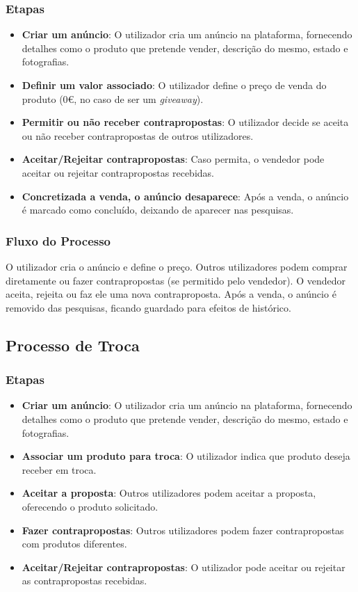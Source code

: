 \documentclass[a4paper, 12pt]{article} %
\begin{document}
\subsubsection{Etapas}
\begin{itemize}
	\item \textbf{Criar um anúncio}: O utilizador cria um anúncio na plataforma, fornecendo detalhes como o produto que pretende vender, descrição do mesmo, estado e fotografias.
	\item \textbf{Definir um valor associado}: O utilizador define o preço de venda do produto (0€, no caso de ser um \textit{giveaway}).
	\item \textbf{Permitir ou não receber contrapropostas}: O utilizador decide se aceita ou não receber contrapropostas de outros utilizadores.
	\item \textbf{Aceitar/Rejeitar contrapropostas}: Caso permita, o vendedor pode aceitar ou rejeitar contrapropostas recebidas.
	\item \textbf{Concretizada a venda, o anúncio desaparece}: Após a venda, o anúncio é marcado como concluído, deixando de aparecer nas pesquisas.
\end{itemize}

\subsubsection{Fluxo do Processo}
O utilizador cria o anúncio e define o preço. Outros utilizadores podem comprar diretamente ou fazer contrapropostas (se permitido pelo vendedor). O vendedor aceita, rejeita ou faz ele uma nova contraproposta. Após a venda, o anúncio é removido das pesquisas, ficando guardado para efeitos de histórico.

\subsection{Processo de Troca}

\subsubsection{Etapas}
\begin{itemize}
	\item \textbf{Criar um anúncio}: O utilizador cria um anúncio na plataforma, fornecendo detalhes como o produto que pretende vender, descrição do mesmo, estado e fotografias.
	\item \textbf{Associar um produto para troca}: O utilizador indica que produto deseja receber em troca.
	\item \textbf{Aceitar a proposta}: Outros utilizadores podem aceitar a proposta, oferecendo o produto solicitado.
	\item \textbf{Fazer contrapropostas}: Outros utilizadores podem fazer contrapropostas com produtos diferentes.
	\item \textbf{Aceitar/Rejeitar contrapropostas}: O utilizador pode aceitar ou rejeitar as contrapropostas recebidas.
\end{itemize}
\end{document}
